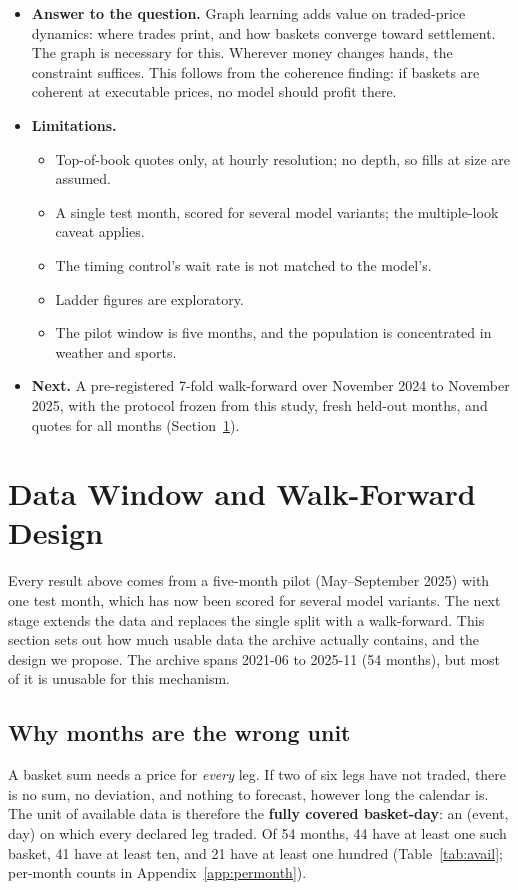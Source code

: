 \documentclass[11pt,a4paper]{article}
\begin{document}
\begin{itemize}
  \item \textbf{Answer to the question.} Graph learning adds value on traded-price
    dynamics: where trades print, and how baskets converge toward settlement. The
    graph is necessary for this. Wherever money changes hands, the constraint
    suffices. This follows from the coherence finding: if baskets are coherent at
    executable prices, no model should profit there.
  \item \textbf{Limitations.}
    \begin{itemize}
      \item Top-of-book quotes only, at hourly resolution; no depth, so fills at
        size are assumed.
      \item A single test month, scored for several model variants; the
        multiple-look caveat applies.
      \item The timing control's wait rate is not matched to the model's.
      \item Ladder figures are exploratory.
      \item The pilot window is five months, and the population is concentrated
        in weather and sports.
    \end{itemize}
  \item \textbf{Next.} A pre-registered 7-fold walk-forward over November 2024 to
    November 2025, with the protocol frozen from this study, fresh held-out
    months, and quotes for all months (Section~\ref{sec:window}).
\end{itemize}

\section{Data Window and Walk-Forward Design}\label{sec:window}
Every result above comes from a five-month pilot (May--September 2025) with one
test month, which has now been scored for several model variants. The next stage
extends the data and replaces the single split with a walk-forward. This section
sets out how much usable data the archive actually contains, and the design we
propose. The archive spans 2021-06 to 2025-11 (54 months), but most of it is
unusable for this mechanism.

\subsection{Why months are the wrong unit}
A basket sum needs a price for \emph{every} leg. If two of six legs have not
traded, there is no sum, no deviation, and nothing to forecast, however long the
calendar is. The unit of available data is therefore the \textbf{fully covered
basket-day}: an (event, day) on which every declared leg traded. Of 54 months,
44 have at least one such basket, 41 have at least ten, and 21 have at least one
hundred (Table~\ref{tab:avail}; per-month counts in Appendix~\ref{app:permonth}).
\end{document}
